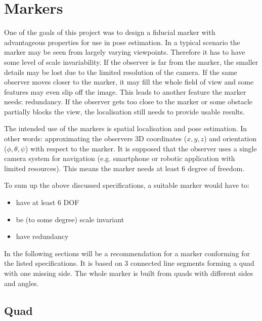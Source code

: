 \chapter{Markers}\label{sect:marker}

One of the goals of this project was to design a fiducial marker with advantageous properties for use in pose estimation.
In a typical scenario the marker may be seen from largely varying viewpoints.
Therefore it has to have some level of scale invariability.
If the observer is far from the marker, the smaller details may be lost due to the limited resolution of the camera.
If the same observer moves closer to the marker, it may fill the whole field of view and some features may even slip off the image.
This leads to another feature the marker needs: redundancy.
If the observer gets too close to the marker or some obstacle partially blocks the view, the localisation still needs to provide usable results.

The intended use of the markers is spatial localisation and pose estimation.
In other words: approximating the observers 3D coordinates ($x, y, z$) and orientation ($\phi, \theta, \psi$) with respect to the marker.
It is supposed that the observer uses a single camera system for navigation (e.g. smartphone or robotic application with limited resources).
This means the marker needs at least 6 degree of freedom.

To sum up the above discussed specifications, a suitable marker would have to:
\begin{itemize}
	\item have at least 6 DOF
	\item be (to some degree) scale invariant
	\item have redundancy
\end{itemize}

In the following sections will be a recommendation for a marker conforming for the listed specifications.
It is based on 3 connected line segments forming a quad with one missing side.
The whole marker is built from quads with different sides and angles.

\section{Quad}

